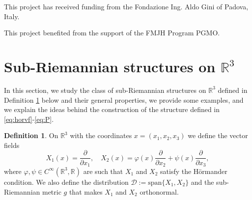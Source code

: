 \documentclass[12pt]{amsart}
\theoremstyle{plain}
\theoremstyle{definition}
\newtheorem{definition}[theorem]{Definition}
\theoremstyle{remark}
\numberwithin{equation}{section}
\newcommand{\R}{\mathbb{R}}
\newcommand{\D}{\mathcal{D}}
\newcommand{\oo}{\infty}
\newcommand{\<}{\langle}
\renewcommand{\>}{\rangle}
\newcommand{\0}{\theta}
\renewcommand{\d}{\partial}
\newcommand{\1}{{-1}}
\newcommand{\vspan}{\mathrm{span}}
\renewcommand{\=}{\coloneqq}
\renewcommand{\.}{\dots}
\renewcommand{\-}{\cdot}
\renewcommand{\:}{\,:\,}
\theoremstyle{definition}
\begin{document}
This project has received funding from the Fondazione Ing. Aldo Gini of Padova, Italy.

This project benefited from the support of the FMJH Program PGMO.





























































\section{Sub-Riemannian structures on $\R^3$}
\label{sec:notation}


In this section, we study the class of sub-Riemannian structures on $\R^3$ defined in Definition \ref{def:general_setting} below and their general properties, we provide some examples, and we explain the ideas behind the construction of the structure defined in \eqref{eq:horvf}-\eqref{eq:P}. 


\begin{definition}
	\label{def:general_setting}
	On $\R^3$ with the coordinates $x=(x_1,x_2,x_3)$ we define the vector fields
	\begin{equation}
		X_1(x)=\frac{\d}{\d x_1}, \quad X_2(x)=\varphi(x)\frac{\d}{\d x_2} + \psi(x)\frac{\d}{\d x_3},
	\end{equation}
	where $\varphi,\psi\in C^\oo(\R^3,\R)$ are such that $X_1$ and $X_2$ satisfy the H\"ormander condition. We also define the distribution $\D := \vspan\{X_1, X_2\}$ and the sub-Riemannian metric $g$ that makes $X_1$ and $X_2$ orthonormal.
\end{definition}
\end{document}
